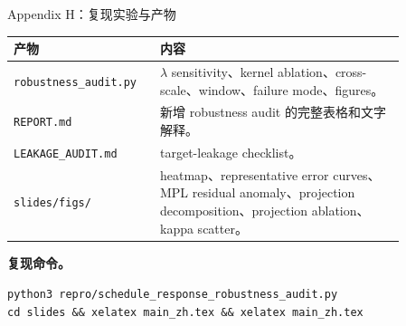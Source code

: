 \documentclass[9pt,aspectratio=169,fontset=fandol]{ctexbeamer}
\newcommand{\code}[1]{\texttt{\small #1}}
\begin{document}
\begin{frame}{Appendix H：复现实验与产物}
\small
\begin{center}
\begin{tabular}{L{0.28\linewidth}L{0.58\linewidth}}
\toprule
产物 & 内容\\
\midrule
\code{robustness\_audit.py} &
\(\lambda\) sensitivity、kernel ablation、cross-scale、window、failure mode、figures。\\
\addlinespace
\code{REPORT.md} &
新增 robustness audit 的完整表格和文字解释。\\
\addlinespace
\code{LEAKAGE\_AUDIT.md} &
target-leakage checklist。\\
\addlinespace
\code{slides/figs/} &
heatmap、representative error curves、MPL residual anomaly、projection decomposition、projection ablation、kappa scatter。\\
\bottomrule
\end{tabular}
\end{center}
\vfill
\textbf{复现命令。}
\begin{center}
\scriptsize
\code{python3 repro/schedule\_response\_robustness\_audit.py}\\[0.2em]
\code{cd slides \&\& xelatex main\_zh.tex \&\& xelatex main\_zh.tex}
\end{center}
\end{frame}
\end{document}
